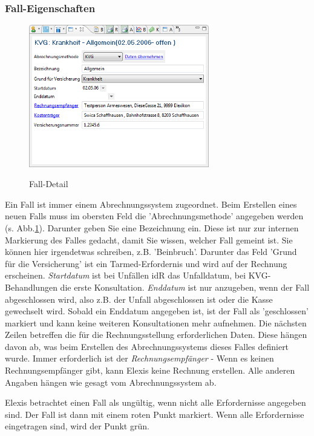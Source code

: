 \documentclass[a4paper]{scrartcl}
\begin{document}
\subsubsection{Fall-Eigenschaften}
\label{fall-erfordernisse}
\begin{figure}
  \includegraphics[width=0.7\textwidth]{abr8}\\
  \caption{Fall-Detail}\label{fig:abr8}
\end{figure}
Ein Fall ist immer einem Abrechnungssystem zugeordnet. Beim Erstellen eines neuen Falls muss im obersten Feld die 'Abrechnungsmethode' angegeben werden (s. Abb.\ref{fig:abr8}).
Darunter geben Sie eine Bezeichnung ein. Diese ist nur zur internen Markierung des Falles gedacht, damit Sie wissen, welcher Fall gemeint ist. Sie können hier irgendetwas schreiben, z.B. 'Beinbruch'.
Darunter das Feld 'Grund für die Versicherung' ist ein Tarmed-Erfordernis und wird auf der Rechnung erscheinen.
\textit{Startdatum} ist bei Unfällen idR das Unfalldatum, bei KVG-Behandlungen die erste Konsultation.
\textit{Enddatum} ist nur anzugeben, wenn der Fall abgeschlossen wird, also z.B. der Unfall abgeschlossen ist oder die Kasse gewechselt wird. Sobald ein Enddatum angegeben ist, ist der Fall als 'geschlossen' markiert und kann keine weiteren Konsultationen mehr aufnehmen.
Die nächsten Zeilen betreffen die für die Rechnungsstellung erforderlichen Daten. Diese hängen davon ab, was beim Erstellen des Abrechnungssystems dieses Falles definiert wurde.
Immer erforderlich ist der \textit{Rechnungsempfänger} - Wenn es keinen Rechnungsempfänger gibt, kann Elexis keine Rechnung erstellen.
Alle anderen Angaben hängen wie gesagt vom Abrechnungssystem ab.

Elexis betrachtet einen Fall als ungültig, wenn nicht alle Erfordernisse angegeben sind. Der Fall ist dann mit einem roten Punkt markiert. Wenn alle Erfordernisse eingetragen sind, wird der Punkt grün.
\end{document}

